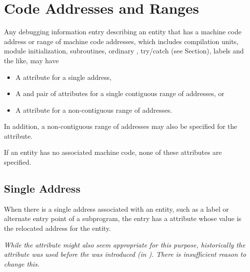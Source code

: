 \section{Code Addresses and Ranges}
\label{chap:codeaddressesandranges}
Any debugging information entry describing an entity that has
a machine code address or range of machine code addresses,
which includes compilation units, module initialization,
\hypertarget{chap:DWATrangesnoncontiguousrangeofcodeaddresses}{}
subroutines, ordinary , 
try/catch  (see Section), 
labels and the like, may have
\begin{itemize}
\item A \DWATlowpc{} attribute for
\hypertarget{chap:DWATlowpccodeaddressorrangeofaddresses}{}
a single address,

\item A \DWATlowpc{}
and 
\DWAThighpc{}
\hypertarget{chap:DWAThighpccontiguousrangeofcodeaddresses}{}
pair of attributes for 
a single contiguous range of
addresses, or

\item A \DWATranges{} attribute 
for a non-contiguous range of addresses.
\end{itemize}

In addition, a non-contiguous range of 
addresses may also be specified for the
\DWATstartscope{} attribute.

If an entity has no associated machine code, 
none of these attributes are specified.

\subsection{Single Address} 
When there is a single address associated with an entity,
such as a label or alternate entry point of a subprogram,
the entry has a \DWATlowpc{} attribute whose value is the
relocated address for the entity.

\textit{While the \DWATentrypc{}
attribute might also seem appropriate for this purpose,
historically the \DWATlowpc{} attribute was used before the
\DWATentrypc{} was introduced 
(in ). There is
insufficient reason to change this.}

